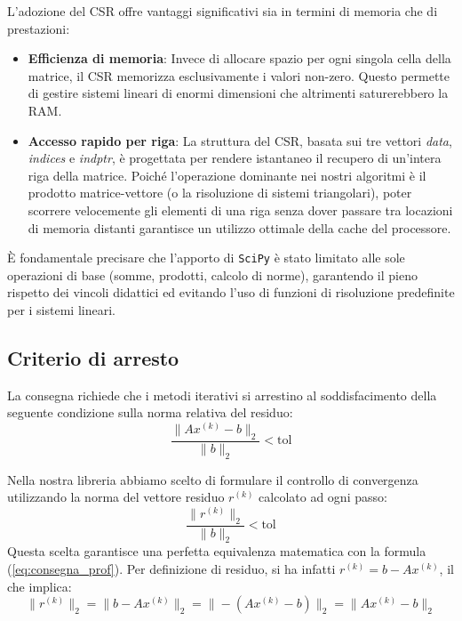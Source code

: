 \documentclass[a4paper, 12pt]{report}
\begin{document}
\noindent L'adozione del CSR offre vantaggi significativi sia in termini di memoria che di prestazioni:
\begin{itemize}
    \item \textbf{Efficienza di memoria}: Invece di allocare spazio per ogni singola cella della matrice, il CSR memorizza esclusivamente i valori non-zero. Questo permette di gestire sistemi lineari di enormi dimensioni che altrimenti saturerebbero la RAM.
    \item \textbf{Accesso rapido per riga}: La struttura del CSR, basata sui tre vettori \textit{data}, \textit{indices} e \textit{indptr}, è progettata per rendere istantaneo il recupero di un'intera riga della matrice. Poiché l'operazione dominante nei nostri algoritmi è il prodotto matrice-vettore (o la risoluzione di sistemi triangolari), poter scorrere velocemente gli elementi di una riga senza dover passare tra locazioni di memoria distanti garantisce un utilizzo ottimale della cache del processore.
\end{itemize}

È fondamentale precisare che l'apporto di \texttt{SciPy} è stato limitato alle sole operazioni di base (somme, prodotti, calcolo di norme), garantendo il pieno rispetto dei vincoli didattici ed evitando l'uso di funzioni di risoluzione predefinite per i sistemi lineari.

\subsection{Criterio di arresto}

La consegna richiede che i metodi iterativi si arrestino al soddisfacimento della seguente condizione sulla norma relativa del residuo:
\begin{equation} \label{eq:consegna_prof}
    \frac{\|Ax^{(k)} - b\|_2}{\|b\|_2} < \text{tol}
\end{equation}

\noindent Nella nostra libreria abbiamo scelto di formulare il controllo di convergenza utilizzando la norma del vettore residuo $r^{(k)}$ calcolato ad ogni passo:
\begin{equation} \label{eq:nostra_formula}
    \frac{\|r^{(k)}\|_2}{\|b\|_2} < \text{tol}
\end{equation}
Questa scelta garantisce una perfetta equivalenza matematica con la formula (\ref{eq:consegna_prof}). Per definizione di residuo, si ha infatti $r^{(k)} = b - Ax^{(k)}$, il che implica:
$$\|r^{(k)}\|_2 = \|b - Ax^{(k)}\|_2 = \|-(Ax^{(k)} - b)\|_2 = \|Ax^{(k)} - b\|_2$$
\end{document}
